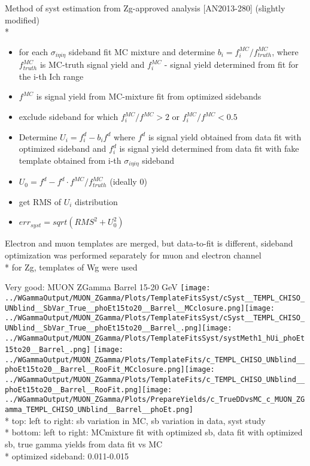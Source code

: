 \documentclass{beamer}
\begin{document}
\begin{frame}{Method of syst estimation from Zg-approved analysis [AN2013-280] (slightly modified)}\\*
    \scriptsize
    \begin{itemize}
      \item for each $\sigma_{i\eta{i}\eta}$ sideband fit MC mixture and determine $b_{i}=f_{i}^{MC}/f^{MC}_{truth}$, where $f^{MC}_{truth}$ is MC-truth signal yield and $f_{i}^{MC}$ - signal yield determined from fit for the i-th Ich range
      \item $f^{MC}$ is signal yield from MC-mixture fit from optimized sidebands
      \item exclude sideband for which $f_{i}^{MC}/f^{MC}>2$ or $f_{i}^{MC}/f^{MC}<0.5$
      \item Determine $U_{i}=f_{i}^{d}-b_{i}f^{d}$ where $f^{d}$ is signal yield obtained from data fit with optimized sideband and $f_{i}^{d}$ is signal yield determined from data fit with fake template obtained from i-th $\sigma_{i\eta{i}\eta}$ sideband
      \item $U_{0}=f^{d}-f^{d}{\cdot}f^{MC}/f^{MC}_{truth}$ (ideally 0)
      \item get RMS of $U_{i}$ distribution
      \item $err_{syst}=sqrt(RMS^{2}+U_{0}^2)$
    \end{itemize}
    Electron and muon templates are merged, but data-to-fit is different, sideband optimization was performed separately for muon and electron channel\\*
    for Zg, templates of Wg were used 
\end{frame}

\begin{frame}{Very good: MUON ZGamma Barrel 15-20 GeV}
  \texttt{[image: ../WGammaOutput/MUON\_ZGamma/Plots/TemplateFitsSyst/cSyst\_\_TEMPL\_CHISO\_UNblind\_\_SbVar\_True\_\_phoEt15to20\_\_Barrel\_\_MCclosure.png]}\texttt{[image: ../WGammaOutput/MUON\_ZGamma/Plots/TemplateFitsSyst/cSyst\_\_TEMPL\_CHISO\_UNblind\_\_SbVar\_True\_\_phoEt15to20\_\_Barrel\_.png]}\texttt{[image: ../WGammaOutput/MUON\_ZGamma/Plots/TemplateFitsSyst/systMeth1\_hUi\_phoEt15to20\_\_Barrel\_.png]}
  \texttt{[image: ../WGammaOutput/MUON\_ZGamma/Plots/TemplateFits/c\_TEMPL\_CHISO\_UNblind\_\_phoEt15to20\_\_Barrel\_\_RooFit\_MCclosure.png]}\texttt{[image: ../WGammaOutput/MUON\_ZGamma/Plots/TemplateFits/c\_TEMPL\_CHISO\_UNblind\_\_phoEt15to20\_\_Barrel\_\_RooFit.png]}\texttt{[image: ../WGammaOutput/MUON\_ZGamma/Plots/PrepareYields/c\_TrueDDvsMC\_c\_MUON\_ZGamma\_TEMPL\_CHISO\_UNblind\_\_Barrel\_\_phoEt.png]}\\*
  \scriptsize top: left to right: sb variation in MC, sb variation in data, syst study\\*
  \scriptsize bottom: left to right: MCmixture fit with optimized sb, data fit with optimized sb, true gamma yields from data fit vs MC\\*
  \scriptsize optimized sideband: 0.011-0.015
\end{frame}
\end{document}
